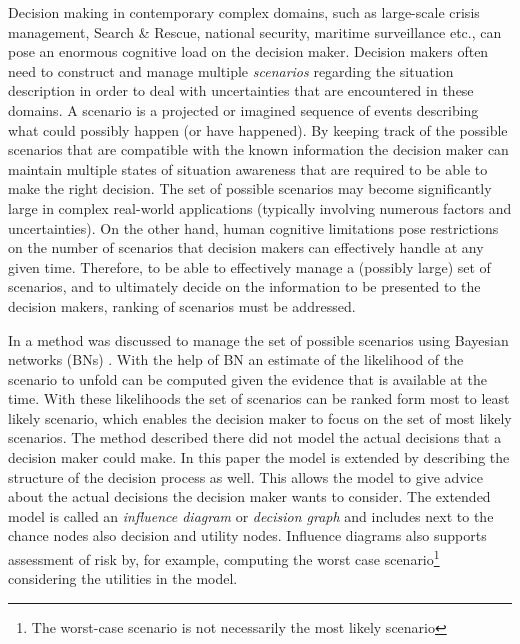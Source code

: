 \documentclass[conference]{IEEEtran}
\begin{document}


Decision making in contemporary complex domains, such as large-scale crisis management, Search \& Rescue, national security, maritime surveillance etc., can pose an enormous cognitive load on the decision maker. Decision makers often need to construct and manage multiple {\em scenarios} regarding the situation description in order to deal with uncertainties that are encountered in these domains. A scenario is a projected or imagined sequence of events describing what could possibly happen (or have happened). By keeping track of the possible scenarios that are compatible with the known information the decision maker can maintain multiple states of situation awareness that are required to be able to make the right decision. The set of possible scenarios may become significantly large in complex real-world applications (typically involving numerous factors and uncertainties). On the other hand, human cognitive limitations pose restrictions on the number of scenarios that decision makers can effectively handle at any given time. Therefore, to be able to effectively manage a (possibly large) set of scenarios, and to ultimately decide on the information to be presented to the decision makers, ranking of scenarios must be addressed.

In \cite{conrado14if} a method was discussed to manage the set of possible scenarios using Bayesian networks (BNs) \cite{pearl88book, jensen07book}. With the help of BN an estimate of the likelihood of the scenario to unfold can be computed given the evidence that is available at the time. With these likelihoods the set of scenarios can be ranked form most to least likely scenario, which enables the decision maker to focus on the set of most likely scenarios. The method described there did not model the actual decisions that a decision maker could make. In this paper the model is extended by describing the structure of the decision process as well. This allows the model to give advice about the actual decisions the decision maker wants to consider. The extended model is called an {\em influence diagram} or {\em decision graph} \cite{jensen07book} and includes next to the chance nodes also decision and utility nodes. Influence diagrams also supports assessment of risk by, for example, computing the worst case scenario\footnote{The worst-case scenario is not necessarily the most likely scenario} considering the utilities in the model.
\end{document}
